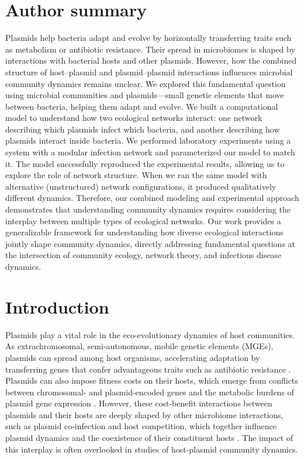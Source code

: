 \documentclass[10pt,letterpaper]{article}
\begin{document}
\section*{Author summary}
Plasmids help bacteria adapt and evolve by horizontally transferring traits such as metabolism or antibiotic resistance. Their spread in microbiomes is shaped by interactions with bacterial hosts and other plasmids. However, how the combined structure of host–plasmid and plasmid–plasmid interactions influences microbial community dynamics remains unclear. We explored this fundamental question using microbial communities and plasmids---small genetic elements that move between bacteria, helping them adapt and evolve. We built a computational model to understand how two ecological networks interact: one network describing which plasmids infect which bacteria, and another describing how plasmids interact inside bacteria. We performed laboratory experiments using a system with a modular infection network and parameterized our model to match it. The model successfully reproduced the experimental results, allowing us to explore the role of network structure. When we ran the same model with alternative (unstructured) network configurations, it produced qualitatively different dynamics. Therefore, our combined modeling and experimental approach demonstrates that understanding community dynamics requires considering the interplay between multiple types of ecological networks. Our work provides a generalizable framework for understanding how diverse ecological interactions jointly shape community dynamics, directly addressing fundamental questions at the intersection of community ecology, network theory, and infectious disease dynamics.

\linenumbers

\section*{Introduction}
Plasmids play a vital role in the eco-evolutionary dynamics of host communities. As extrachromosomal, semi-autonomous, mobile genetic elements (MGEs), plasmids can spread among host organisms, accelerating adaptation by transferring genes that confer advantageous traits such as antibiotic resistance \cite{Kornelia2015-hn, San-Millan2018-bi, Rodriguez-Beltran2021-ue}. Plasmids can also impose fitness costs on their hosts, which emerge from conflicts between chromosomal- and plasmid-encoded genes and the metabolic burdens of plasmid gene expression \cite{San_Millan2017-xt, Hall2021-lo}. However, these cost-benefit interactions between plasmids and their hosts are deeply shaped by other microbiome interactions, such as plasmid co-infection and host competition, which together influence plasmid dynamics and the coexistence of their constituent hosts \cite{Ghoul2016-vo, Coyte2022-xx, Igler2022-lv, Dewan2023-xt, Hall2016-zb, Kottara2021-wg, Pilosof2020-lz}. The impact of this interplay is often overlooked in studies of host-plasmid community dynamics.
\end{document}
